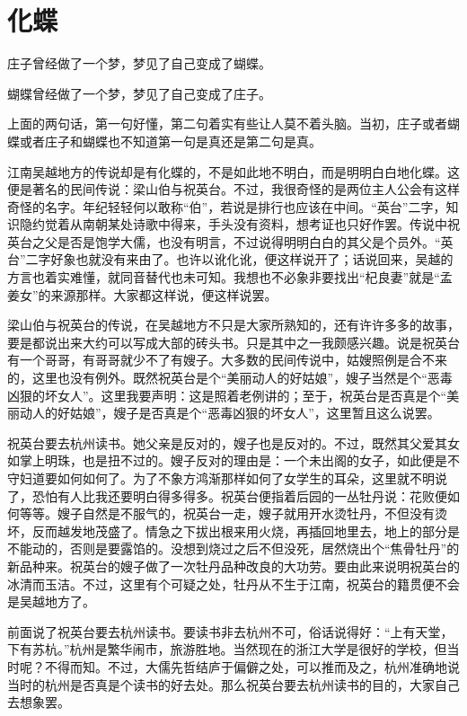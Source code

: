 \chapter[化蝶]{化\qquad 蝶}

庄子曾经做了一个梦，梦见了自己变成了蝴蝶。

蝴蝶曾经做了一个梦，梦见了自己变成了庄子。

上面的两句话，第一句好懂，第二句着实有些让人莫不着头脑。当初，庄子或者蝴蝶或者庄子和蝴蝶也不知道第一句是真还是第二句是真。

江南吴越地方的传说却是有化蝶的，不是如此地不明白，而是明明白白地化蝶。这便是著名的民间传说：梁山伯与祝英台。不过，我很奇怪的是两位主人公会有这样奇怪的名字。年纪轻轻何以敢称“伯”，若说是排行也应该在中间。“英台”二字，知识隐约觉着从南朝某处诗歌中得来，手头没有资料，想考证也只好作罢。传说中祝英台之父是否是饱学大儒，也没有明言，不过说得明明白白的其父是个员外。“英台”二字好象也就没有来由了。也许以讹化讹，便这样说开了；话说回来，吴越的方言也着实难懂，就同音替代也未可知。我想也不必象非要找出“杞良妻”就是“孟姜女”的来源那样。大家都这样说，便这样说罢。

梁山伯与祝英台的传说，在吴越地方不只是大家所熟知的，还有许许多多的故事，要是都说出来大约可以写成大部的砖头书。只是其中之一我颇感兴趣。说是祝英台有一个哥哥，有哥哥就少不了有嫂子。大多数的民间传说中，姑嫂照例是合不来的，这里也没有例外。既然祝英台是个“美丽动人的好姑娘”，嫂子当然是个“恶毒凶狠的坏女人”。这里我要声明：这是照着老例讲的；至于，祝英台是否真是个“美丽动人的好姑娘”，嫂子是否真是个“恶毒凶狠的坏女人”，这里暂且这么说罢。

祝英台要去杭州读书。她父亲是反对的，嫂子也是反对的。不过，既然其父爱其女如掌上明珠，也是扭不过的。嫂子反对的理由是：一个未出阁的女子，如此便是不守妇道要如何如何了。为了不象方鸿渐那样如何了女学生的耳朵，这里就不明说了，恐怕有人比我还要明白得多得多。祝英台便指着后园的一丛牡丹说：花败便如何等等。嫂子自然是不服气的，祝英台一走，嫂子就用开水烫牡丹，不但没有烫坏，反而越发地茂盛了。情急之下拔出根来用火烧，再插回地里去，地上的部分是不能动的，否则是要露馅的。没想到烧过之后不但没死，居然烧出个“焦骨牡丹”的新品种来。祝英台的嫂子做了一次牡丹品种改良的大功劳。要由此来说明祝英台的冰清而玉洁。不过，这里有个可疑之处，牡丹从不生于江南，祝英台的籍贯便不会是吴越地方了。

前面说了祝英台要去杭州读书。要读书非去杭州不可，俗话说得好：“上有天堂，下有苏杭。”杭州是繁华闹市，旅游胜地。当然现在的浙江大学是很好的学校，但当时呢？不得而知。不过，大儒先哲结庐于偏僻之处，可以推而及之，杭州准确地说当时的杭州是否真是个读书的好去处。那么祝英台要去杭州读书的目的，大家自己去想象罢。


